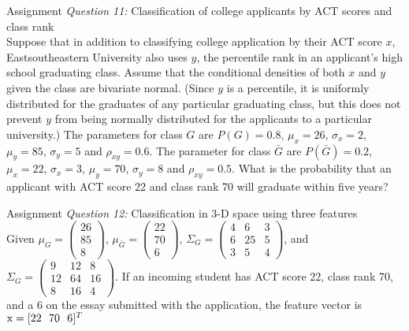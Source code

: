 \begin{frame}{Assignment}
\textit{\color{slidecolor}Question 11:} {\color{slidecolor}Classification of college applicants by ACT scores and class rank}\\
Suppose that in addition to classifying college application by their ACT score $x$, Eastsoutheastern University also uses $y$, the percentile rank in an applicant's high school graduating class. Assume that the conditional densities of both $x$ and $y$ given the class are bivariate normal. (Since $y$ is a percentile, it is uniformly distributed for the graduates of any particular graduating class, but this does not prevent $y$ from being normally distributed for the applicants to a particular university.) The parameters for class $G$ are $P(G)=0.8$, $\mu_x=26$, $\sigma_x=2$, $\mu_y=85$, $\sigma_y=5$ and $\rho_{xy} =0.6$. The parameter for class $\bar{G}$ are $P(\bar{G})=0.2$, $\mu_x=22$, $\sigma_x=3$, $\mu_y=70$, $\sigma_y=8$ and $\rho_{xy} =0.5$. What is the probability that an applicant with ACT score 22 and class rank 70 will graduate within five years?
\end{frame}

\begin{frame}{Assignment}
\textit{\color{slidecolor}Question 12:} {\color{slidecolor}Classification in 3-D space using three features}\\
Given ${\mu _G} = \left( {\begin{array}{*{20}{c}}
{26}\\
{85}\\
8
\end{array}} \right)$, ${\mu _{\bar{G}}} = \left( {\begin{array}{*{20}{c}}
{22}\\
{70}\\
6
\end{array}} \right)$, ${\Sigma _G} = \left( {\begin{array}{*{20}{c}}
4&6&3\\
6&{25}&5\\
3&5&4
\end{array}} \right)$, and ${\Sigma _G} = \left( {\begin{array}{*{20}{c}}
9&12&8\\
12&{64}&16\\
8&16&4
\end{array}} \right)$. If an incoming student has ACT score 22, class rank 70, and a 6 on the essay submitted with the application, the feature vector is ${\rm x}=[22~~70~~6]^T$
\end{frame}

